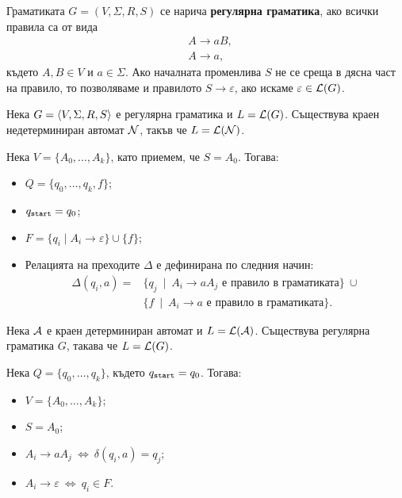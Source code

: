 Граматиката $G = (V, \Sigma, R, S)$ се нарича {\bf регулярна граматика},
ако всички правила са от вида 
\begin{align*}
  & A \to aB,\\
  & A \to a,
\end{align*}
където $A, B \in V$ и $a \in \Sigma$.
Ако началната променлива $S$ не се среща в дясна част на правило, то позволяваме и правилото $S \to \varepsilon$,
ако искаме $\varepsilon \in \mathcal{L}(G)$.

\begin{prop}
  Нека $G = \langle{V,\Sigma,R,S}\rangle$ е регулярна граматика и $L = \mathcal{L}(G)$.
  Съществува краен недетерминиран автомат $\mathcal{N}$, такъв че $L = \mathcal{L}(\mathcal{N})$.
\end{prop}
\begin{hint}
  Нека $V = \{A_0,\dots,A_k\}$, като приемем, че $S = A_0$. Тогава:
  \begin{itemize}
  \item
    $Q = \{q_0,\dots,q_k,f\}$;
  \item
    $q_{\texttt{start}} = q_0$;
  \item
    $F = \{q_i \mid A_i \to \varepsilon\} \cup \{f\}$;
  \item
    Релацията на преходите $\Delta$ е дефинирана по следния начин:
    \begin{align*}
      \Delta(q_i,a) = & \{ q_j\ \mid\ A_i \to aA_j \text{ е правило в граматиката}\}\ \cup\\
                      & \{ f\ \mid\ A_i \to a \text{ е правило в граматиката}\}.
    \end{align*}
  \end{itemize}
\end{hint}

\begin{prop}
  Нека $\mathcal{A}$ е краен детерминиран автомат и $L = \mathcal{L}(\mathcal{A})$.
  Съществува регулярна граматика $G$, такава че $L = \mathcal{L}(G)$.
\end{prop}
\begin{hint}
  Нека $Q = \{q_0,\dots,q_k\}$, където $q_{\texttt{start}} = q_0$. Тогава:
  \begin{itemize}
  \item 
    $V = \{A_0,\dots,A_k\}$;
  \item
    $S = A_0$;
  \item
    $A_i \to aA_j\ \iff\ \delta(q_i,a) = q_j$;
  \item
    $A_{i} \to \varepsilon\ \iff\ q_{i} \in F$.
  \end{itemize}
\end{hint}


